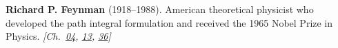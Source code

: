 \nobelphysics \textbf{Richard P. Feynman} (1918–1988). American theoretical physicist who developed the path integral formulation and received the 1965 Nobel Prize in Physics. \emph{[Ch.~\hyperref[ch:energytransmission]{04}, \hyperref[ch:poissonsspot]{13}, \hyperref[ch:qftvsgr]{36}]}

